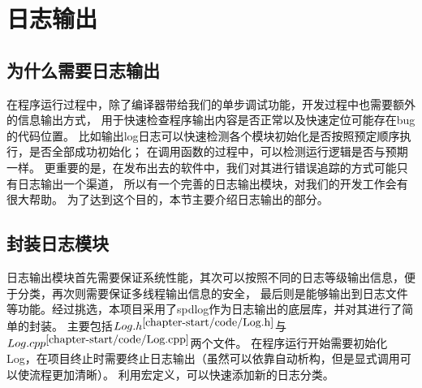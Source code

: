 \section{日志输出}

\subsection{为什么需要日志输出}
在程序运行过程中，除了编译器带给我们的单步调试功能，开发过程中也需要额外的信息输出方式，
用于快速检查程序输出内容是否正常以及快速定位可能存在bug的代码位置。
比如输出log日志可以快速检测各个模块初始化是否按照预定顺序执行，是否全部成功初始化；
在调用函数的过程中，可以检测运行逻辑是否与预期一样。
更重要的是，在发布出去的软件中，我们对其进行错误追踪的方式可能只有日志输出一个渠道，
所以有一个完善的日志输出模块，对我们的开发工作会有很大帮助。
为了达到这个目的，本节主要介绍日志输出的部分。

\subsection{封装日志模块}
日志输出模块首先需要保证系统性能，其次可以按照不同的日志等级输出信息，便于分类，再次则需要保证多线程输出信息的安全，
最后则是能够输出到日志文件等功能。经过挑选，本项目采用了spdlog作为日志输出的底层库，并对其进行了简单的封装。
主要包括$Log.h^{\ref{chapter-start/code/Log.h}}$与$Log.cpp^{\ref{chapter-start/code/Log.cpp}}$两个文件。
在程序运行开始需要初始化Log，在项目终止时需要终止日志输出（虽然可以依靠自动析构，但是显式调用可以使流程更加清晰）。
利用宏定义，可以快速添加新的日志分类。




